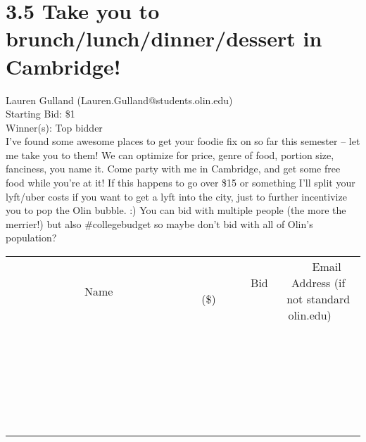 \documentclass[11pt]{article}
\begin{document}
\section*{3.5 Take you to brunch/lunch/dinner/dessert in Cambridge!}
Lauren Gulland (Lauren.Gulland@students.olin.edu) \\
Starting Bid: \$1 \\
Winner(s): 
Top bidder \\
I've found some awesome places to get your foodie fix on so far this semester -- let me take you to them! We can optimize for price, genre of food, portion size, fanciness, you name it. Come party with me in Cambridge, and get some free food while you're at it! 
If this happens to go over \$15 or something I'll split your lyft/uber costs if you want to get a lyft into the city, just to further incentivize you to pop the Olin bubble. :) You can bid with multiple people (the more the merrier!) but also \#collegebudget so maybe don't bid with all of Olin's population? \\[6ex]
\begin{tabular}{c c c}
~~~~~~~~~~~~~Name~~~~~~~~~~~~~ & ~~~~~~~~~Bid (\$)~~~~~~~~~ & ~~~Email Address (if not standard olin.edu)~~~ \\
 & & \\
\hline
 & & \\
\hline
 & & \\
\hline
 & & \\
\hline
 & & \\
\hline
 & & \\
\hline
 & & \\
\hline
 & & \\
\hline
 & & \\
\hline
 & & \\
\hline
 & & \\
\hline
 & & \\
\hline
 & & \\
\hline
 & & \\
\hline
 & & \\
\hline
 & & \\
\hline
 & & \\
\hline
 & & \\
\hline
 & & \\
\hline
 & & \\
\hline
 & & \\
\hline
 & & \\
\hline
 & & \\
\hline
 & & \\
\hline
 & & \\
\hline
 & & \\
\hline
\end{tabular}
\clearpage
\end{document}
